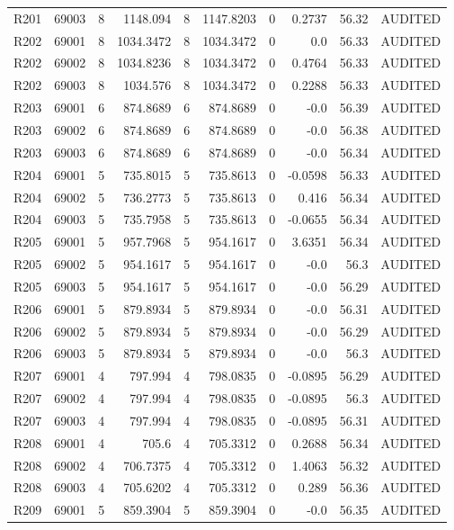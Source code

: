 \begin{tabular}{lrrrrrrrrr}
R201 & 69003 & 8 & 1148.094 & 8 & 1147.8203 & 0 & 0.2737 & 56.32 & AUDITED \\
R202 & 69001 & 8 & 1034.3472 & 8 & 1034.3472 & 0 & 0.0 & 56.33 & AUDITED \\
R202 & 69002 & 8 & 1034.8236 & 8 & 1034.3472 & 0 & 0.4764 & 56.33 & AUDITED \\
R202 & 69003 & 8 & 1034.576 & 8 & 1034.3472 & 0 & 0.2288 & 56.33 & AUDITED \\
R203 & 69001 & 6 & 874.8689 & 6 & 874.8689 & 0 & -0.0 & 56.39 & AUDITED \\
R203 & 69002 & 6 & 874.8689 & 6 & 874.8689 & 0 & -0.0 & 56.38 & AUDITED \\
R203 & 69003 & 6 & 874.8689 & 6 & 874.8689 & 0 & -0.0 & 56.34 & AUDITED \\
R204 & 69001 & 5 & 735.8015 & 5 & 735.8613 & 0 & -0.0598 & 56.33 & AUDITED \\
R204 & 69002 & 5 & 736.2773 & 5 & 735.8613 & 0 & 0.416 & 56.34 & AUDITED \\
R204 & 69003 & 5 & 735.7958 & 5 & 735.8613 & 0 & -0.0655 & 56.34 & AUDITED \\
R205 & 69001 & 5 & 957.7968 & 5 & 954.1617 & 0 & 3.6351 & 56.34 & AUDITED \\
R205 & 69002 & 5 & 954.1617 & 5 & 954.1617 & 0 & -0.0 & 56.3 & AUDITED \\
R205 & 69003 & 5 & 954.1617 & 5 & 954.1617 & 0 & -0.0 & 56.29 & AUDITED \\
R206 & 69001 & 5 & 879.8934 & 5 & 879.8934 & 0 & -0.0 & 56.31 & AUDITED \\
R206 & 69002 & 5 & 879.8934 & 5 & 879.8934 & 0 & -0.0 & 56.29 & AUDITED \\
R206 & 69003 & 5 & 879.8934 & 5 & 879.8934 & 0 & -0.0 & 56.3 & AUDITED \\
R207 & 69001 & 4 & 797.994 & 4 & 798.0835 & 0 & -0.0895 & 56.29 & AUDITED \\
R207 & 69002 & 4 & 797.994 & 4 & 798.0835 & 0 & -0.0895 & 56.3 & AUDITED \\
R207 & 69003 & 4 & 797.994 & 4 & 798.0835 & 0 & -0.0895 & 56.31 & AUDITED \\
R208 & 69001 & 4 & 705.6 & 4 & 705.3312 & 0 & 0.2688 & 56.34 & AUDITED \\
R208 & 69002 & 4 & 706.7375 & 4 & 705.3312 & 0 & 1.4063 & 56.32 & AUDITED \\
R208 & 69003 & 4 & 705.6202 & 4 & 705.3312 & 0 & 0.289 & 56.36 & AUDITED \\
R209 & 69001 & 5 & 859.3904 & 5 & 859.3904 & 0 & -0.0 & 56.35 & AUDITED \\

\end{tabular}
